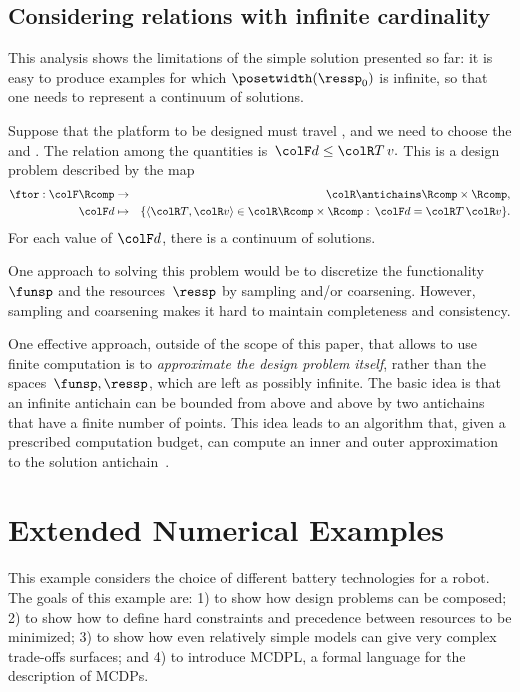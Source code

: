 \subsection{Considering relations with infinite cardinality}

This analysis shows the limitations of the simple solution presented
so far: it is easy to produce examples for which $\posetwidth(\ressp_{0})$
is infinite, so that one needs to represent a continuum of solutions.

\begin{example}
    Suppose that the platform to be designed must travel , and we need to choose the 
    and . The relation among the quantities
    is~${\colF d}\leq{\colR T\,v}.$ This is a design problem described
    by the map
    \begin{eqnarray*}
        \ftor:{\colF\Rcomp} & \rightarrow & {\colR\antichains\Rcomp\times\Rcomp,}\\
        {\colF d} & \mapsto & \{\langle{\colR T},{\colR v}\rangle\in{\colR\Rcomp\times\Rcomp}:\,{\colF d}={\colR T}\,{\colR v}\}.
    \end{eqnarray*}
    For each value of ${\colF d}$, there is a continuum of solutions.
\end{example}
One approach to solving this problem would be to discretize the functionality~$\funsp$
and the resources~$\ressp$ by sampling and/or coarsening. However,
sampling and coarsening makes it hard to maintain completeness and
consistency.

One effective approach, outside of the scope of this paper, that allows
to use finite computation is to \emph{approximate the design problem}
\emph{itself}, rather than the spaces~$\funsp,\ressp$, which are
left as possibly infinite. The basic idea is that an infinite antichain
can be bounded from above and above by two antichains that have a
finite number of points. This idea leads to an algorithm that, given
a prescribed computation budget, can compute an inner and outer approximation
to the solution antichain~\cite{mcdp_icra_uncertainty_arxiv}.


\section{Extended Numerical Examples\label{sec:Numerical-examples}}

This example considers the choice of different battery technologies
for a robot. The goals of this example are: 1) to show how design
problems can be composed; 2) to show how to define hard constraints
and precedence between resources to be minimized; 3) to show how even
relatively simple models can give very complex trade-offs surfaces;
and 4) to introduce MCDPL, a formal language for the description of
MCDPs.

